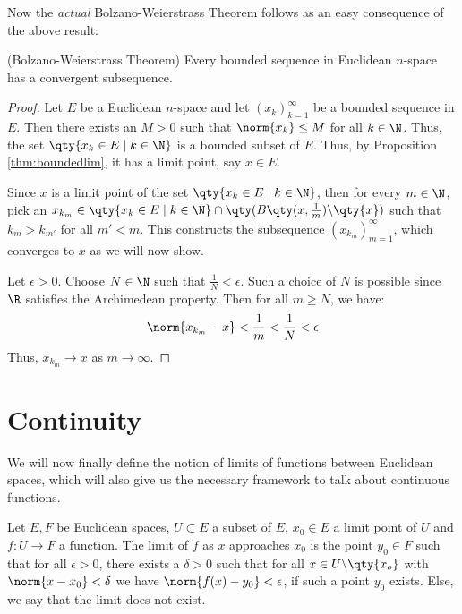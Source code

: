 Now the \emph{actual} Bolzano-Weierstrass Theorem follows as an easy consequence of the above result:

\begin{theorem}
  (Bolzano-Weierstrass Theorem) Every bounded sequence in Euclidean \( n \)-space has a convergent subsequence.
\end{theorem}
\begin{proof}
  Let \( E \) be a Euclidean \( n \)-space and let \( (x_k)_{k=1}^\infty \) be a bounded sequence in \( E \). Then there exists an \( M>0 \) such that \( \norm{x_k}\leq M \) for all \( k\in\N \). Thus, the set \( \qty{x_k\in E\mid k\in\N} \) is a bounded subset of \( E \). Thus, by Proposition \ref{thm:boundedlim}, it has a limit point, say \( x\in E \).

  \vspace{3mm}

  Since \( x \) is a limit point of the set \( \qty{x_k\in E\mid k\in\N} \), then for every \( m\in\N \), pick an \( x_{k_m}\in \qty{x_k\in E\mid k\in\N}\cap\qty(B\qty(x,\frac{1}{m})\backslash\qty{x}) \) such that \( k_m>k_{m'} \) for all \( m'<m \). This constructs the subsequence \( (x_{k_m})_{m=1}^\infty \), which converges to \( x \) as we will now show.

  \vspace{3mm}

  Let \( \epsilon>0 \). Choose \( N\in\N \) such that \( \frac{1}{N}<\epsilon \). Such a choice of \( N \) is possible since \( \R \) satisfies the Archimedean property. Then for all \( m\geq N \), we have:
  \[ \norm{x_{k_m}-x}<\frac{1}{m}<\frac{1}{N}<\epsilon \]
  Thus, \( x_{k_m}\to x \) as \( m\to\infty \).
\end{proof}

\section{Continuity}
We will now finally define the notion of limits of functions between Euclidean spaces, which will also give us the necessary framework to talk about continuous functions.
\begin{definition}
  Let \( E, F \) be Euclidean spaces, \( U\subset E \) a subset of \( E \), \( x_0\in E \) a limit point of \( U \) and \( f:U\to F \) a function. The limit of \( f \) as \( x \) approaches \( x_0 \) is the point \( y_0\in F \) such that for all \( \epsilon>0 \), there exists a \( \delta>0 \) such that for all \( x\in U\backslash\qty{x_o} \) with \( \norm{x-x_0}<\delta \) we have \( \norm{f(x)-y_0}<\epsilon \), if such a point \( y_0 \) exists. Else, we say that the limit does not exist.
\end{definition}


